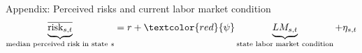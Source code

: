 \documentclass{beamer}
\begin{document}
\begin{frame}{Appendix: Perceived risks and current labor market condition}
	\label{appendix:PR_state_labor_market}
	\begin{eqnarray*}
		\underbrace{\overline{\text{risk}_{s,t}} }_{\text{median perceived risk in state $s$}}= r + \textcolor{red}{\psi} \underbrace{LM_{s,t}}_{\text{state labor market condition}}  + \eta_{s,t}
	\end{eqnarray*}
	\begin{table}
		\centering
		\label{macro_corr_he_state}
	\end{table}
	\quad  \hyperlink{tsMean3mvrvar_he}{} 
\end{frame}
\end{document}
